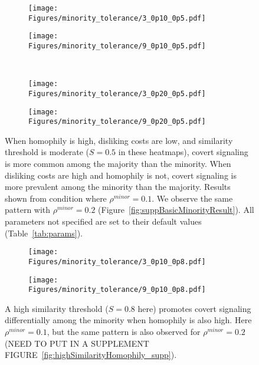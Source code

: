 \documentclass[11pt,letterpaper]{article}
\begin{document}
\begin{figure}
  \centering
  \begin{subfigure}{0.49\textwidth}
      \texttt{[image: Figures/minority\_tolerance/3\_0p10\_0p5.pdf]}
      \caption{}
    \end{subfigure}
    \begin{subfigure}{0.49\textwidth}
      \texttt{[image: Figures/minority\_tolerance/9\_0p10\_0p5.pdf]}
      \caption{}
    \end{subfigure} \\[1em]
    \begin{subfigure}{0.49\textwidth}
      \texttt{[image: Figures/minority\_tolerance/3\_0p20\_0p5.pdf]}
      \caption{}
      \end{subfigure}
    \begin{subfigure}{0.49\textwidth}
      \texttt{[image: Figures/minority\_tolerance/9\_0p20\_0p5.pdf]}
      \caption{}
    \end{subfigure}
    \caption{When homophily is high, disliking costs are low, and
      similarity threshold is moderate ($S=0.5$ in these heatmaps), covert 
    signaling is more common among the majority than the minority. When 
  disliking costs are high and homophily is not, covert signaling is more
prevalent among the minority than the majority. Results shown from condition
where $\rho^{minor}=0.1$. We observe the same pattern with $\rho^{minor}=0.2$
(Figure~\ref{fig:suppBasicMinorityResult}). All parameters not specified are set
to their default values (Table~\ref{tab:params}).}
  \label{fig:}
\end{figure}


\begin{figure}
  \centering
  \begin{subfigure}{0.49\textwidth}
      \texttt{[image: Figures/minority\_tolerance/3\_0p10\_0p8.pdf]}
      \caption{}
    \end{subfigure}
    \begin{subfigure}{0.49\textwidth}
      \texttt{[image: Figures/minority\_tolerance/9\_0p10\_0p8.pdf]}
      \caption{}
    \end{subfigure}
    \caption{A high similarity threshold ($S=0.8$ here) promotes covert
    signaling differentially among the minority when homophily is also high.
    Here $\rho^{minor}=0.1$, but the same pattern is also observed for 
  $\rho^{minor}=0.2$ (NEED TO PUT IN A SUPPLEMENT FIGURE~\ref{fig:highSimilarityHomophily_supp}).}
  \label{fig:highSimilarityHomophily}
\end{figure}
\end{document}
